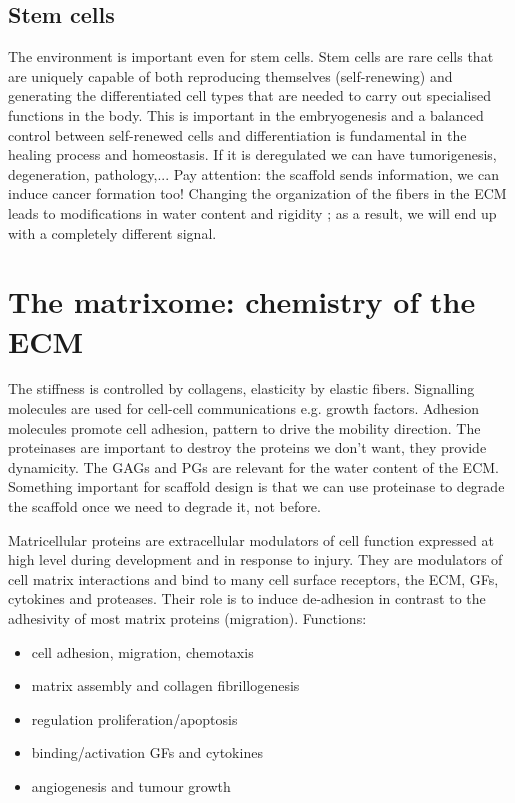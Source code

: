 \subsection{Stem cells}
The environment is important even for stem cells. Stem cells are rare cells that are uniquely capable of both reproducing themselves (self-renewing) and generating the differentiated cell types that are needed to carry out specialised functions in the body. 
This is important in the embryogenesis and a balanced control between self-renewed cells and differentiation is fundamental in the healing process and homeostasis. If it is deregulated we can have tumorigenesis, degeneration, pathology,...
Pay attention: the scaffold sends information, we can induce cancer formation too! 
Changing the organization of the fibers in the ECM leads to modifications in water content and rigidity ; as a result, we will end up with a completely different signal.

\section{The matrixome: chemistry of the ECM}
The stiffness is controlled by collagens, elasticity by elastic fibers. 
Signalling molecules are used for cell-cell communications e.g. growth factors. 
Adhesion molecules promote cell adhesion, pattern to drive the mobility direction. 
The proteinases are important to destroy the proteins we don’t want, they provide dynamicity. The GAGs and PGs are relevant for the water content of the ECM. 
Something important for scaffold design is that we can use proteinase to degrade the scaffold once we need to degrade it, not before.

Matricellular proteins are extracellular modulators of cell function expressed at high level during development and in response to injury. They are modulators of cell matrix interactions and bind to many cell surface receptors, the ECM, GFs, cytokines and proteases. Their role is to induce de-adhesion in contrast to the adhesivity of most matrix proteins (migration).
\noindent
Functions:
\begin{itemize}
\item cell adhesion, migration, chemotaxis
\item matrix assembly and collagen fibrillogenesis
\item regulation proliferation/apoptosis
\item binding/activation GFs and cytokines
\item angiogenesis and tumour growth 
\end{itemize}

